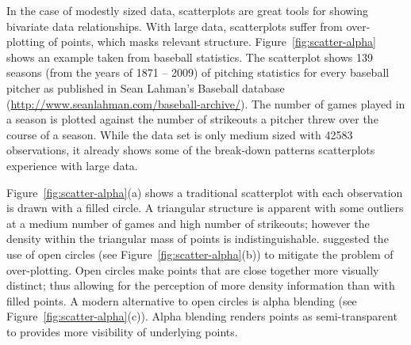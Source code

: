 \documentclass[11pt]{isuthesis}\usepackage[]{graphicx}\usepackage[]{color}
\begin{document}
In the case of modestly sized data, scatterplots are great tools for showing bivariate data relationships. With large data, scatterplots suffer from over-plotting of points, which masks relevant structure. Figure~\ref{fig:scatter-alpha} shows an example taken from baseball statistics. The scatterplot shows 139 seasons (from the years of 1871 -- 2009) of  pitching statistics for every baseball pitcher as published in Sean Lahman's Baseball database (\url{http://www.seanlahman.com/baseball-archive/}).  The number of games played in a season is plotted against the number of strikeouts a pitcher threw over the course of a season. While the data set is only medium sized with 42583 observations, it already shows some of the break-down patterns scatterplots experience with large data. 

Figure~\ref{fig:scatter-alpha}(a) shows a traditional scatterplot with each observation is drawn with a filled circle. A triangular structure is apparent with some outliers at a medium number of games and high number of strikeouts; however the density within the triangular mass of points is indistinguishable. \citet{tukey} suggested the use of open circles (see Figure~\ref{fig:scatter-alpha}(b)) to mitigate the problem of over-plotting. Open circles make points that are close together more visually distinct; thus allowing for the perception of more density information than with filled points.  A modern alternative to open circles is alpha blending (see Figure~\ref{fig:scatter-alpha}(c)). Alpha blending renders points as semi-transparent to provides more visibility of underlying points.
\end{document}
